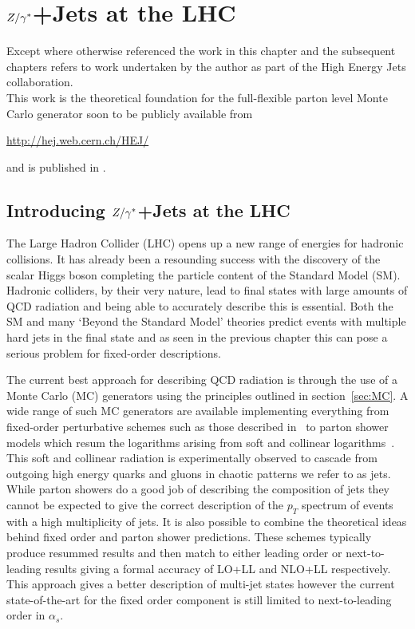 
\chapter{$Z/\gamma^*$+Jets at the LHC}
\label{chap:Zs}

	Except where otherwise referenced the work in this chapter and the subsequent chapters refers to
	work undertaken by the author as part of the High Energy Jets collaboration.\\This work is the theoretical foundation for the
	full-flexible parton level Monte Carlo generator soon to be publicly available from

	\begin{center}
		\url{http://hej.web.cern.ch/HEJ/}
	\end{center}

	and is published in \cite{ZPaper}.

\section{Introducing $Z/\gamma^*$+Jets at the LHC}

	The Large Hadron Collider (LHC) opens up a new range of energies for hadronic
	collisions.  It has already been a resounding success with the discovery of the
	scalar Higgs boson completing the particle content of the Standard Model (SM).
	Hadronic colliders, by their very nature, lead to final states with large
	amounts of QCD radiation and being able to accurately describe this is
	essential.  Both the SM and many `Beyond the Standard Model' theories
	predict events with multiple hard jets in the final state and as seen in the
	previous chapter this can pose a serious problem for fixed-order descriptions.

	The current best approach for describing QCD radiation is through the use of
	a Monte Carlo (MC) generators using the principles outlined in section~\ref{sec:MC}.
	A wide range of such MC generators are available implementing everything from
	fixed-order perturbative schemes such as those described in~\cite{Mangano:2002ea,Badger:2012pg} to parton
	shower models which resum the logarithms arising from soft and collinear logarithms~\cite{Gleisberg:2008ta,Sjostrand:2007gs,Corcella:2000bw}.
	This soft and collinear radiation is experimentally observed to cascade from outgoing
	high energy quarks and gluons in chaotic patterns we refer to as jets.  While parton
	showers do a good job of describing the composition of jets they cannot be expected to give the correct
	description of the $p_T$ spectrum of events with a high multiplicity of jets.
	It is also possible to combine the
	theoretical ideas behind fixed order and parton shower predictions.  These schemes typically
	produce resummed results and then match to either leading order or next-to-leading
	results giving a formal accuracy of LO+LL and NLO+LL respectively.  This approach gives a
	better description of multi-jet states however the current state-of-the-art for the
	fixed order component is still limited to next-to-leading order in $\alpha_s$.

